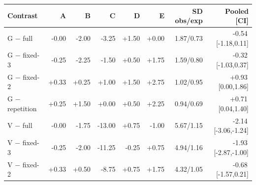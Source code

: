 \begin{tabular}{lrrrrrrr}
\toprule
Contrast & A & B & C & D & E & SD obs/exp & Pooled [CI] \\
\midrule
G $-$ full & -0.00 & -2.00 & -3.25 & +1.50 & +0.00 & 1.87/0.73 & -0.54\,[-1.18,0.11] \\
G $-$ fixed-3 & -0.25 & -2.25 & -1.50 & +0.50 & +1.75 & 1.59/0.80 & -0.32\,[-1.03,0.37] \\
G $-$ fixed-2 & +0.33 & +0.25 & +1.00 & +1.50 & +2.75 & 1.02/0.95 & +0.93\,[0.00,1.86] \\
G $-$ repetition & +0.25 & +1.50 & +0.00 & +0.50 & +2.25 & 0.94/0.69 & +0.71\,[0.04,1.40] \\
V $-$ full & -0.00 & -1.75 & -13.00 & +0.75 & -1.00 & 5.67/1.15 & -2.14\,[-3.06,-1.24] \\
V $-$ fixed-3 & -0.25 & -2.00 & -11.25 & -0.25 & +0.75 & 4.94/1.16 & -1.93\,[-2.87,-1.00] \\
V $-$ fixed-2 & +0.33 & +0.50 & -8.75 & +0.75 & +1.75 & 4.32/1.05 & -0.68\,[-1.57,0.21] \\
\bottomrule
\end{tabular}
